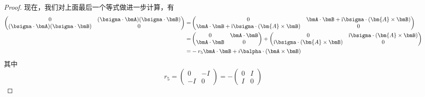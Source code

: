 \begin{proof}
    现在，我们对上面最后一个等式做进一步计算，有
    \begin{equation}
        \begin{aligned}
            \begin{pmatrix}
                0  &  (\bsigma \cdot \bmA) (\bsigma \cdot \bmB) \\
                (\bsigma \cdot \bmA) (\bsigma \cdot \bmB) &  0  \\
            \end{pmatrix}
            =& \begin{pmatrix}
                0 & \bmA \cdot \bmB + {\rm i} \bsigma \cdot (\bm{A} \times \bmB) \\
                \bmA \cdot \bmB + {\rm i} \bsigma \cdot (\bm{A} \times \bmB) & 0 \\
            \end{pmatrix} \\
            =& \begin{pmatrix}
                0 & \bmA \cdot \bmB \\
                \bmA \cdot \bmB & 0 \\
            \end{pmatrix} 
            + \begin{pmatrix}
                0 & {\rm i} \bsigma \cdot (\bm{A} \times \bmB) \\
                {\rm i} \bsigma \cdot (\bm{A} \times \bmB) & 0 \\
            \end{pmatrix} \\
            =& - r_5 \bmA \cdot \bmB + i \balpha \cdot (\bmA \times \bmB)
        \end{aligned}
    \end{equation}
    其中
    \begin{equation*}
        r_5 = \begin{pmatrix}
            0 & -I \\
            -I & 0
        \end{pmatrix}
        = -\begin{pmatrix}
            0 & I \\
            I & 0
        \end{pmatrix}
    \end{equation*}
\end{proof}


